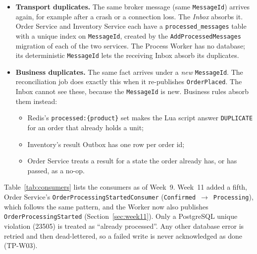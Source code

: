 \documentclass[a4paper]{report}
\begin{document}
\begin{itemize}
  \item \textbf{Transport duplicates.} The same broker message (same
    \texttt{MessageId}) arrives again, for example after a crash or a
    connection loss. The \emph{Inbox} absorbs it. Order Service and Inventory
    Service each have a \texttt{processed\_messages} table with a unique index
    on \texttt{MessageId}, created by the \texttt{AddProcessedMessages}
    migration of each of the two services. The Process Worker has no database;
    its deterministic \texttt{MessageId} lets the receiving Inbox absorb its
    duplicates.
  \item \textbf{Business duplicates.} The same fact arrives under a
    \emph{new} \texttt{MessageId}. The reconciliation job does exactly this
    when it re-publishes \texttt{OrderPlaced}. The Inbox cannot see these,
    because the \texttt{MessageId} is new. Business rules absorb them
    instead:
    \begin{itemize}
      \item Redis's \texttt{processed:\{product\}} set makes the Lua script
        answer \texttt{DUPLICATE} for an order that already holds a unit;
      \item Inventory's result Outbox has one row per order id;
      \item Order Service treats a result for a state the order already
        has, or has passed, as a no-op.
    \end{itemize}
\end{itemize}

Table~\ref{tab:consumers} lists the consumers as of Week~9. Week~11 added a fifth, Order Service's \texttt{OrderProcessingStartedConsumer} (\texttt{Confirmed}~$\to$~\texttt{Processing}), which follows the same pattern, and the Worker now also publishes \texttt{OrderProcessingStarted} (Section~\ref{sec:week11}). Only a PostgreSQL unique
violation (23505) is treated as ``already processed''. Any other database
error is retried and then dead-lettered, so a failed write is never
acknowledged as done (TP-W03).
\end{document}
